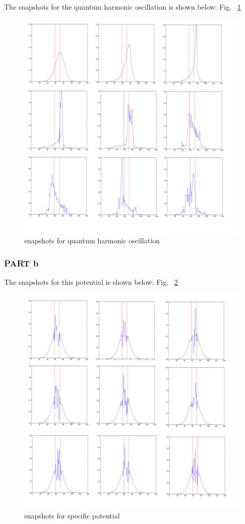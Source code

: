 \documentclass[11pt,letterpaper]{article}
\begin{document}
The snapshots for the quantum harmonic oscillation is shown below: Fig. ~\ref{figure8}




\begin{figure}
\begin{center}
\includegraphics[width=0.8\linewidth,angle=0]{p32.png}
\caption{snapshots for quantum harmonic oscillation}
\label{figure8}
\end{center}
\end{figure}
\subsubsection{PART b}

The snapshots for this potential is shown below: Fig. ~\ref{figure9}

\begin{figure}
\begin{center}
\includegraphics[width=0.8\linewidth,angle=0]{p324.png}
\caption{snapshots for specific potential}
\label{figure9}
\end{center}
\end{figure}
\end{document}
